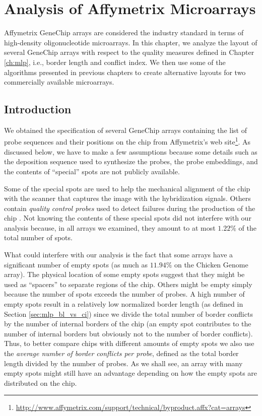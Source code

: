 \chapter{Analysis of Affymetrix Microarrays}
\label{ch:affy}

Affymetrix GeneChip arrays are considered the industry standard in terms of
high-density oligonucleotide microarrays. In this chapter, we analyze the layout
of several GeneChip arrays with respect to the quality measures defined in
Chapter \ref{ch:mlp}, i.e., border length and conflict index. We then use some
of the algorithms presented in previous chapters to create alternative layouts
for two commercially available microarrays.

\section{Introduction}
\label{sec:affy_intro}

We obtained the specification of several GeneChip arrays containing the list of
probe sequences and their positions on the chip from Affymetrix's web
site\footnote{\url{http://www.affymetrix.com/support/technical/byproduct.affx?cat=arrays}}.
As discussed below, we have to make a few assumptions because some details such
as the deposition sequence used to synthesize the probes, the probe embeddings,
and the contents of ``special'' spots are not publicly available.

Some of the special spots are used to help the mechanical alignment of the chip
with the scanner that captures the image with the hybridization signals. Others
contain \emph{quality control probes} used to detect failures during the
production of the chip \citep{Affymetrix2002,Hubbell1999a}. Not knowing the
contents of these special spots did not interfere with our analysis because, in
all arrays we examined, they amount to at most $1.22\%$ of the total number of
spots.

What could interfere with our analysis is the fact that some arrays have a
significant number of empty spots (as much as $11.94\%$ on the Chicken Genome
array). The physical location of some empty spots suggest that they might be
used as ``spacers'' to separate regions of the chip. Others might be empty
simply because the number of spots exceeds the number of probes. A high number
of empty spots result in a relatively low normalized border length (as defined
in Section \ref{sec:mlp_bl_vs_ci}) since we divide the total number of border
conflicts by the number of internal borders of the chip (an empty spot
contributes to the number of internal borders but obviously not to the number of
border conflicts). Thus, to better compare chips with different amounts of empty
spots we also use the \emph{average number of border conflicts per probe},
defined as the total border length divided by the number of probes. As we shall
see, an array with many empty spots might still have an advantage depending on
how the empty spots are distributed on the chip.

